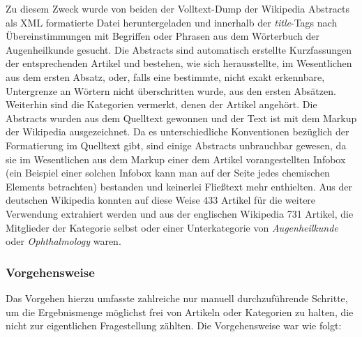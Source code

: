 \documentclass[pagesize,DIV=calc,12pt,draft]{scrreprt}
\begin{document}
Zu diesem Zweck wurde von beiden der Volltext-Dump der Wikipedia Abstracts als XML formatierte Datei heruntergeladen und innerhalb der \emph{title}-Tags nach Übereinstimmungen mit Begriffen oder Phrasen aus dem Wörterbuch der Augenheilkunde gesucht. 
Die Abstracts sind automatisch erstellte Kurzfassungen der entsprechenden Artikel und bestehen, wie sich herausstellte, im Wesentlichen aus dem ersten Absatz, oder, falls eine bestimmte, nicht exakt erkennbare, Untergrenze an Wörtern nicht überschritten wurde, aus den ersten Absätzen. 
Weiterhin sind die Kategorien vermerkt, denen der Artikel angehört. 
Die Abstracts wurden aus dem Quelltext gewonnen und der Text ist mit dem Markup der Wikipedia ausgezeichnet. 
Da es unterschiedliche Konventionen bezüglich der Formatierung im Quelltext gibt, sind einige Abstracts unbrauchbar gewesen, da sie im Wesentlichen aus dem Markup einer dem Artikel vorangestellten Infobox (ein Beispiel einer solchen Infobox kann man auf der Seite jedes chemischen Elements betrachten) bestanden und keinerlei Fließtext mehr enthielten. 
Aus der deutschen Wikipedia konnten auf diese Weise 433 Artikel für die weitere Verwendung extrahiert werden und aus der englischen Wikipedia 731 Artikel, die Mitglieder der Kategorie selbst oder einer Unterkategorie von \emph{Augenheilkunde} oder \emph{Ophthalmology} waren. 

\subsubsection{Vorgehensweise}

Das Vorgehen hierzu umfasste zahlreiche nur manuell durchzuführende Schritte, um die Ergebnismenge möglichst frei von Artikeln oder Kategorien zu halten, die nicht zur eigentlichen Fragestellung zählten. 
Die Vorgehensweise war wie folgt: 
\end{document}

